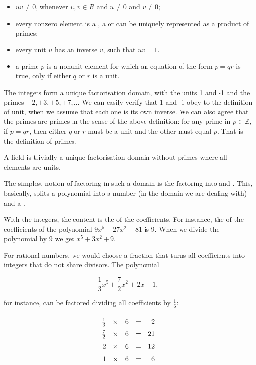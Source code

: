 \documentclass[tikz]{scrreprt}
\begin{document}
\begin{itemize}
\item $uv \neq 0$, whenever $u,v \in R$ and 
      $u \neq 0$ and $v \neq 0$;
\item every nonzero element is a ,
      a  or can be uniquely represented 
      as a product of primes;
\item every unit $u$ has an inverse $v$, such that
      $uv = 1$.
\item a prime $p$ is a nonunit element for which an
      equation of the form $p = qr$ is true, only 
      if either $q$ or $r$ is a unit.
\end{itemize} 

The integers form a unique factorisation domain,
with the units 1 and -1 and the primes 
$\pm 2, \pm 3, \pm 5, \pm 7, \dots$
We can easily verify that 1 and -1 obey to
the definition of unit, 
when we assume that each one is its own inverse.
We can also agree that the primes are primes
in the sense of the above definition: for any prime
in $p \in \mathbb{Z}$, if $p = qr$, then either 
$q$ or $r$ must be a unit and the other must equal $p$.
That is the definition of primes.

A field is trivially a unique factorisation domain
without primes where all elements are units.

The simplest notion of factoring in such a domain
is the factoring into  and
. This, basically, splits a polynomial
into a number (in the domain we are dealing with) and
a . 

With the integers, the content is the  of the
coefficients. For instance, the  
of the coefficients of the polynomial 
$9x^5 + 27x^2 + 81$ is 9. 
When we divide the polynomial by 9 we get
$x^5 + 3x^2 + 9$.

For rational numbers, we would choose a fraction
that turns all coefficients into integers that do
not share divisors. The polynomial

\[
\frac{1}{3}x^5 + \frac{7}{2}x^2 + 2x + 1,
\]

for instance, can be factored dividing 
all coefficients by $\frac{1}{6}$:

\[
\begingroup
\renewcommand{\arraystretch}{1.5}
\begin{array}{rcrcr}
\frac{1}{3} & \times & 6 & = & 2\\
\frac{7}{2} & \times & 6 & = & 21\\
2 & \times & 6 & = & 12\\
1 & \times & 6 & = & 6
\end{array}
\endgroup
\]
\end{document}

